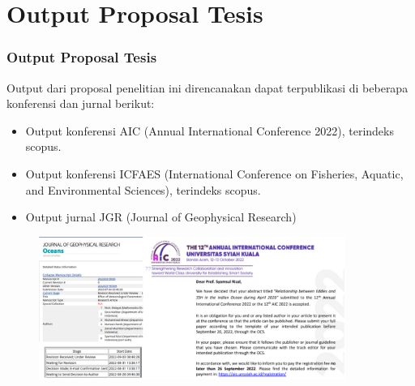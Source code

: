\documentclass{beamer}
\begin{document}
\section{Output Proposal Tesis}
\begin{frame}[allowframebreaks]
	\frametitle{Output Proposal Tesis}
	Output dari proposal penelitian ini direncanakan dapat terpublikasi di beberapa konferensi dan jurnal berikut:
	\begin{itemize}
		\item Output konferensi AIC (Annual International Conference 2022), terindeks scopus.
		\item Output konferensi ICFAES (International Conference on Fisheries, Aquatic, and Environmental Sciences), terindeks scopus.
		\item Output jurnal JGR (Journal of Geophysical Research)
	\end{itemize}
	\begin{figure}[H]
		\centering
		\includegraphics[width=10cm]{proof.png}
		\captionsetup{labelformat=empty}
	\end{figure}
\end{frame}
\ThankYouFrame
\end{document}
